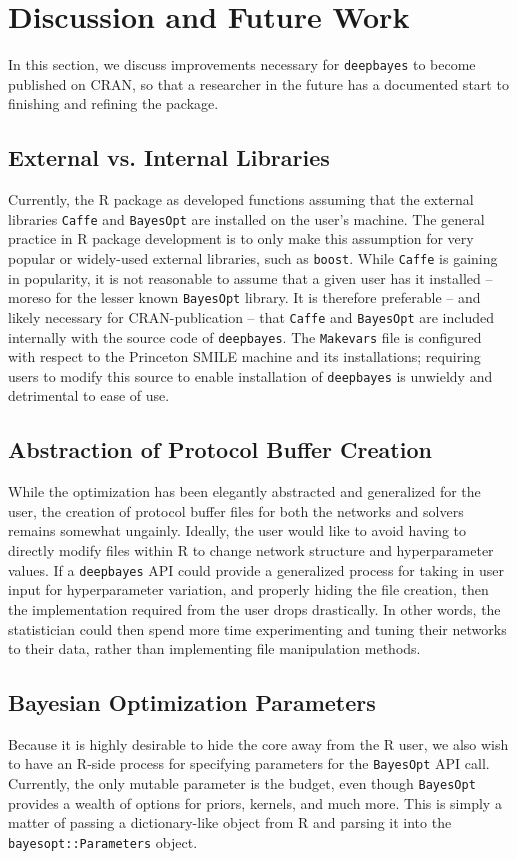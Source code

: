 \documentclass[master]{subfiles}
\begin{document}
\section{Discussion and Future Work}
In this section, we discuss improvements necessary for \lstinline{deepbayes} to become published on CRAN, so that a researcher in the future has a documented start to finishing and refining the package.
\subsection{External vs. Internal Libraries}
Currently, the R package as developed functions assuming that the external \CPP libraries \lstinline{Caffe} and \lstinline{BayesOpt} are installed on the user's machine.  The general practice in R package development is to only make this assumption for very popular or widely-used external libraries, such as \lstinline{boost}.  While \lstinline{Caffe} is gaining in popularity, it is not reasonable to assume that a given user has it installed -- moreso for the lesser known \lstinline{BayesOpt} library.  It is therefore preferable -- and likely necessary for CRAN-publication -- that \lstinline{Caffe} and \lstinline{BayesOpt} are included internally with the source code of \lstinline{deepbayes}.  The \lstinline{Makevars} file is configured with respect to the Princeton SMILE machine and its installations; requiring users to modify this source to enable installation of \lstinline{deepbayes} is unwieldy and detrimental to ease of use.
\subsection{Abstraction of Protocol Buffer Creation}\label{sec:db_abstr}
While the optimization has been elegantly abstracted and generalized for the user, the creation of protocol buffer files for both the networks and solvers remains somewhat ungainly.  Ideally, the user would like to avoid having to directly modify files within R to change network structure and hyperparameter values.  If a \lstinline{deepbayes} API could provide a generalized process for taking in user input for hyperparameter variation, and properly hiding the file creation, then the implementation required from the user drops drastically.  In other words, the statistician could then spend more time experimenting and tuning their networks to their data, rather than implementing file manipulation methods.
\subsection{Bayesian Optimization Parameters}
Because it is highly desirable to hide the core \CPP away from the R user, we also wish to have an R-side process for specifying parameters for the \lstinline{BayesOpt} API call.  Currently, the only mutable parameter is the budget, even though \lstinline{BayesOpt} provides a wealth of options for priors, kernels, and much more.  This is simply a matter of passing a dictionary-like object from R and parsing it into the \lstinline{bayesopt::Parameters} object.
\end{document}
